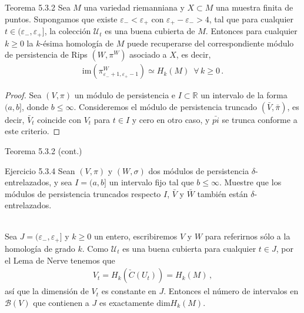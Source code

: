 \documentclass{beamer}
\newcounter{Ejercicio}
\begin{document}
\begin{frame}
\begin{block}{Teorema 5.3.2} Sea $M$ una variedad riemanniana y $X\subset M$ una muestra finita de puntos. Supongamos que existe $\varepsilon_{-}<\varepsilon_{+}$ con  $\varepsilon_{+}-\varepsilon_{-}>4$, tal que para cualquier $t\in (\varepsilon_{-},\varepsilon_{+}]$, la colecci\'on $\mathcal{U}_t$ es una buena cubierta de $M$. Entonces para cualquier $k\geq 0$ la $k$-\'esima homolog\'ia de $M$ puede recuperarse del correspondiente m\'odulo de persistencia de Rips $(W,\pi^W)$ asociado a $X$, es decir,
\begin{gather*}
\mbox{im}(\pi_{\varepsilon_{-}+1,\varepsilon_{+}-1}^{W})\simeq H_k(M)\,\,\, \forall\, k\geq 0\,.
\end{gather*}
\end{block}
\begin{proof}\phantom{\qedhere}
Sea $(V,\pi)$ un m\'odulo de persistencia e $I\subset\mathbb{R}$ un intervalo de la forma $(a,b]$, donde $b\leq \infty$. Consideremos el m\'odulo de persistencia truncado $(\bar{V},\bar{\pi})$, es decir, $\bar{V}_t$ coincide con $V_t$ para $t\in I$ y cero en otro caso, y $\bar{pi}$ se trunca conforme a este criterio.
\end{proof}
\end{frame}

\begin{frame}{Teorema 5.3.2 (cont.)}
\begin{minipage}{0.25\textwidth}
\end{minipage}\hfill\begin{minipage}{0.7\textwidth}
\begin{block}{Ejercicio 5.3.4} Sean $(V,\pi)$ y $(W,\sigma)$ dos m\'odulos de persistencia $\delta$-entrelazados, y sea $I=(a,b]$ un intervalo fijo tal que $b\leq\infty$. Muestre que los m\'odulos de persistencia truncados respecto $I$, $\bar{V}$ y $\bar{W}$ tambi\'en est\'an $\delta$-entrelazados.
\end{block}
\end{minipage}\\
$\,$\\
\vspace{1em}
Sea $J=(\varepsilon_{-},\varepsilon_{+}]$ y $k\geq 0$ un entero, escribiremos $V$ y $W$ para referirnos s\'olo a la homolog\'ia de grado $k$. Como $\mathcal{U}_t$ es una buena cubierta para cualquier $t\in J$, por el Lema de Nerve tenemos que
\begin{gather*}
V_t=H_k(\check{C}(U_t))=H_k(M)\,,
\end{gather*}
as\'i que la dimensi\'on de $V_t$ es constante en $J$. Entonces el n\'umero de intervalos en $\mathcal{B}(V)$ que contienen a $J$ es exactamente $\mbox{dim}H_k(M)$.
\end{frame}
\end{document}

